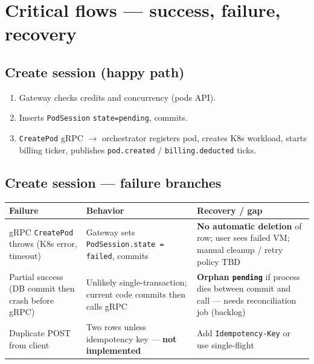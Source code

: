 \documentclass[12pt,a4paper]{article}
\begin{document}
\section{Critical flows --- success, failure, recovery}
\label{app:critical-flows}

\subsection{Create session (happy path)}
\begin{enumerate}[leftmargin=*]
  \item Gateway checks credits and concurrency (pods API).
  \item Inserts \texttt{PodSession} \texttt{state=pending}, commits.
  \item \texttt{CreatePod} gRPC $\rightarrow$ orchestrator registers pod, creates K8s workload, starts billing ticker, publishes \texttt{pod.created} / \texttt{billing.deducted} ticks.
\end{enumerate}

\subsection{Create session --- failure branches}
\begin{tabularx}{\textwidth}{@{}L{3.2cm} X X@{}}
  \toprule
  \textbf{Failure} & \textbf{Behavior} & \textbf{Recovery / gap} \\
  \midrule
  gRPC \texttt{CreatePod} throws (K8s error, timeout) & Gateway sets \texttt{PodSession.state = failed}, commits & \textbf{No automatic deletion} of row; user sees failed VM; manual cleanup / retry policy TBD \\
  Partial success (DB commit then crash before gRPC) & Unlikely single-transaction; current code commits then calls gRPC & \textbf{Orphan \texttt{pending}} if process dies between commit and call --- needs reconciliation job (backlog) \\
  Duplicate POST from client & Two rows unless idempotency key --- \textbf{not implemented} & Add \texttt{Idempotency-Key} or use single-flight \\
  \bottomrule
\end{tabularx}
\end{document}

